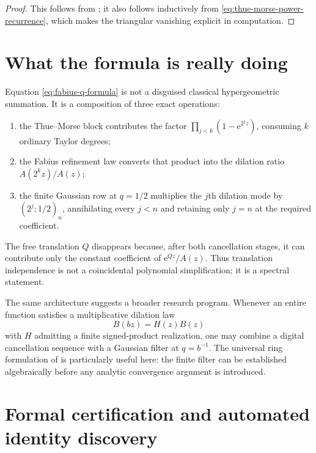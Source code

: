 \documentclass[11pt,oneside,openany]{book}
\theoremstyle{definition}
\theoremstyle{remark}
\newcommand{\e}{\mathrm e}
\begin{document}
\begin{proof}
This follows from ; it also follows inductively from \eqref{eq:thue-morse-power-recurrence}, which makes the triangular vanishing explicit in computation.
\end{proof}

\section{What the formula is really doing}

Equation \eqref{eq:fabius-q-formula} is not a disguised classical hypergeometric summation.  It is a composition of three exact operations:
\begin{enumerate}
\item the Thue--Morse block contributes the factor
$\prod_{j<k}(1-\e^{2^jz})$, consuming $k$ ordinary Taylor degrees;
\item the Fabius refinement law converts that product into the dilation ratio $A(2^kz)/A(z)$;
\item the finite Gaussian row at $q=1/2$ multiplies the $j$th dilation mode by $(2^j;1/2)_n$, annihilating every $j<n$ and retaining only $j=n$ at the required coefficient.
\end{enumerate}
The free translation $Q$ disappears because, after both cancellation stages, it can contribute only the constant coefficient of $\e^{Qz}/A(z)$.  Thus translation independence is not a coincidental polynomial simplification; it is a spectral statement.

The same architecture suggests a broader research program.  Whenever an entire function satisfies a multiplicative dilation law
\[
 B(bz)=H(z)B(z)
\]
with $H$ admitting a finite signed-product realization, one may combine a digital cancellation sequence with a Gaussian filter at $q=b^{-1}$.  The universal ring formulation of  is particularly useful here: the finite filter can be established algebraically before any analytic convergence argument is introduced.

\section{Formal certification and automated identity discovery}
\end{document}
